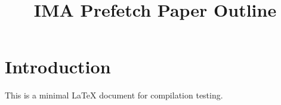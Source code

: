 \documentclass{article}
\title{IMA Prefetch Paper Outline}
\author{}
\date{}
\begin{document}
\maketitle

\section{Introduction}

This is a minimal LaTeX document for compilation testing.
\end{document}
